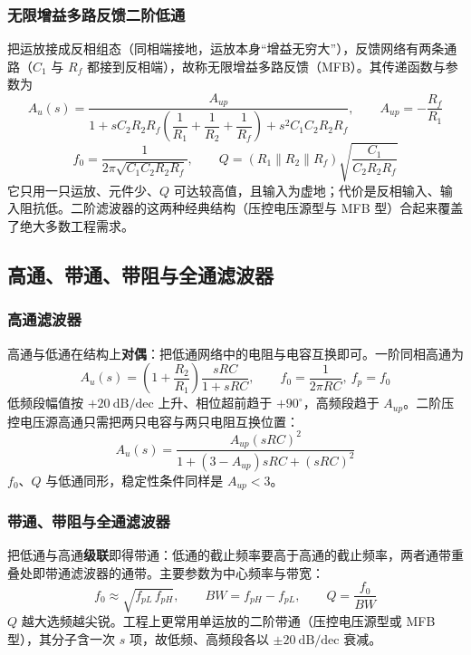 \subsubsection{无限增益多路反馈二阶低通}
把运放接成反相组态（同相端接地，运放本身“增益无穷大”），反馈网络有两条通路（$C_1$ 与 $R_f$ 都接到反相端），故称无限增益多路反馈（MFB）。其传递函数与参数为
\begin{equation}
A_u(s)=\frac{A_{up}}{1+sC_2R_2R_f\left(\dfrac{1}{R_1}+\dfrac{1}{R_2}+\dfrac{1}{R_f}\right)+s^2C_1C_2R_2R_f},
\qquad A_{up}=-\frac{R_f}{R_1}
\end{equation}
\begin{equation}
f_0=\frac{1}{2\pi\sqrt{C_1C_2R_2R_f}},\qquad
Q=(R_1\parallel R_2\parallel R_f)\sqrt{\frac{C_1}{C_2R_2R_f}}
\end{equation}
它只用一只运放、元件少、$Q$ 可达较高值，且输入为虚地；代价是反相输入、输入阻抗低。二阶滤波器的这两种经典结构（压控电压源型与 MFB 型）合起来覆盖了绝大多数工程需求。

\subsection{高通、带通、带阻与全通滤波器}
\subsubsection{高通滤波器}
高通与低通在结构上\textbf{对偶}：把低通网络中的电阻与电容互换即可。一阶同相高通为
\begin{equation}
A_u(s)=\left(1+\frac{R_2}{R_1}\right)\frac{sRC}{1+sRC},\qquad f_0=\frac{1}{2\pi RC},\ f_p=f_0
\end{equation}
低频段幅值按 $+20\ \mathrm{dB/dec}$ 上升、相位超前趋于 $+90^\circ$，高频段趋于 $A_{up}$。二阶压控电压源高通只需把两只电容与两只电阻互换位置：
\begin{equation}
A_u(s)=\frac{A_{up}(sRC)^2}{1+(3-A_{up})sRC+(sRC)^2}
\end{equation}
$f_0$、$Q$ 与低通同形，稳定性条件同样是 $A_{up}<3$。

\subsubsection{带通、带阻与全通滤波器}
把低通与高通\textbf{级联}即得带通：低通的截止频率要高于高通的截止频率，两者通带重叠处即带通滤波器的通带。主要参数为中心频率与带宽：
\begin{equation}
f_0\approx\sqrt{f_{pL}\,f_{pH}},\qquad BW=f_{pH}-f_{pL},\qquad Q=\frac{f_0}{BW}
\end{equation}
$Q$ 越大选频越尖锐。工程上更常用单运放的二阶带通（压控电压源型或 MFB 型），其分子含一次 $s$ 项，故低频、高频段各以 $\pm20\ \mathrm{dB/dec}$ 衰减。

